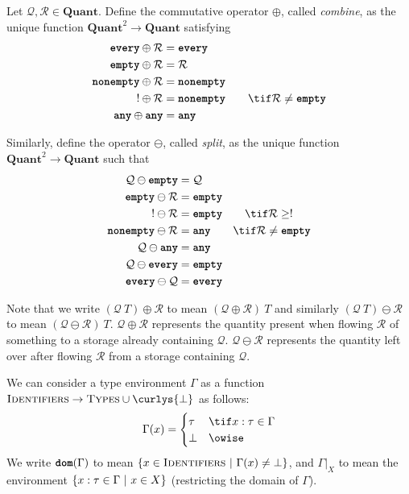 \documentclass[10pt]{article}
\begin{document}
\begin{definition}
    Let $\mathcal{Q}, \mathcal{R} \in \textbf{Quant}$.
    Define the commutative operator $\oplus$, called \emph{combine}, as the unique function $\textbf{Quant}^2 \to \textbf{Quant}$  satisfying
    \begin{align*}
        \every \oplus \mathcal{R} &= \every \\
        \emptyq \oplus \mathcal{R} &= \mathcal{R} \\
        \nonempty \oplus \mathcal{R} &= \nonempty \\
        \exactlyone \oplus \mathcal{R} &= \nonempty \qquad \tif \mathcal{R} \neq \emptyq \\
        \any \oplus \any &= \any
    \end{align*}

    Similarly, define the operator $\ominus$, called \emph{split}, as the unique function $\textbf{Quant}^2 \to \textbf{Quant}$ such that
    \begin{align*}
        \mathcal{Q} \ominus \emptyq & = \mathcal{Q} \\
        \emptyq \ominus \mathcal{R} & = \emptyq \\
        \exactlyone \ominus \mathcal{R} &= \emptyq \qquad \tif \mathcal{R} \geq \exactlyone \\
        \nonempty \ominus \mathcal{R} &= \any \qquad \tif \mathcal{R} \neq \emptyq \\
        \mathcal{Q} \ominus \any &= \any \\
        \mathcal{Q} \ominus \every & = \emptyq \\
        \every \ominus \mathcal{Q} &= \every
    \end{align*}
\end{definition}

Note that we write $(\mathcal{Q}~T) \oplus \mathcal{R}$ to mean $(\mathcal{Q} \oplus \mathcal{R})~T$ and similarly $(\mathcal{Q}~T) \ominus \mathcal{R}$ to mean $(\mathcal{Q} \ominus \mathcal{R})~T$.
$\mathcal{Q} \oplus \mathcal{R}$ represents the quantity present when flowing $\mathcal{R}$ of something to a storage already containing $\mathcal{Q}$.
$\mathcal{Q} \ominus \mathcal{R}$ represents the quantity left over after flowing $\mathcal{R}$ from a storage containing $\mathcal{Q}$.

\begin{definition}
    We can consider a type environment $\Gamma$ as a function $\textsc{Identifiers}\xspace \to \textsc{Types}\xspace \cup \curlys{\bot}$ as follows:
    \[
        \Gamma(x) =
        \begin{cases}
            \tau & \tif x : \tau \in \Gamma \\
            \bot & \owise
        \end{cases}
    \]
    We write $\textbf{\texttt{dom}}(\Gamma)$ to mean $\left\{ {x \in \textsc{Identifiers}} ~|~ {\Gamma(x) \neq \bot} \right\}$, and $\Gamma|_X$ to mean the environment $\left\{ {x : \tau \in \Gamma} ~|~ {x \in X} \right\}$ (restricting the domain of $\Gamma$).
\end{definition}
\end{document}
